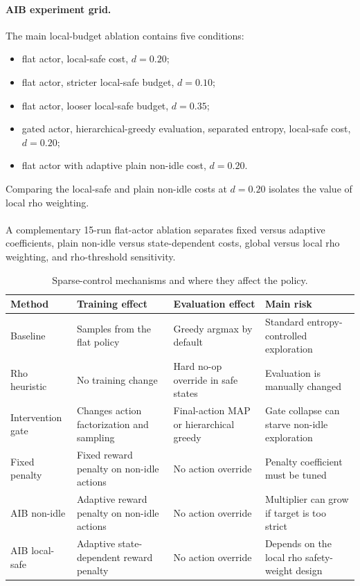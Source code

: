\paragraph{AIB experiment grid.}
The main local-budget ablation contains five conditions:
\begin{itemize}
  \item flat actor, local-safe cost, $d=0.20$;
  \item flat actor, stricter local-safe budget, $d=0.10$;
  \item flat actor, looser local-safe budget, $d=0.35$;
  \item gated actor,
  hierarchical-greedy evaluation, separated entropy, local-safe cost,
  $d=0.20$;
  \item flat actor with adaptive plain non-idle cost, $d=0.20$.
\end{itemize}
Comparing the local-safe and plain non-idle costs at $d=0.20$ isolates the
value of local rho weighting.
\\
\\
A complementary 15-run flat-actor ablation separates fixed versus adaptive coefficients,
plain non-idle versus state-dependent costs, global versus local rho weighting,
and rho-threshold sensitivity.

\begin{table}[htbp]
  \centering
  \small
  \caption{Sparse-control mechanisms and where they affect the policy.}
  \label{tab:sparse-control-mechanisms}
  \setlength{\tabcolsep}{3pt}
  \begin{tabular}{L{0.18\textwidth}L{0.30\textwidth}L{0.24\textwidth}L{0.18\textwidth}}
    \toprule
    Method & Training effect & Evaluation effect & Main risk \\
    \midrule
    Baseline & Samples from the flat policy & Greedy argmax by default &
    Standard entropy-controlled exploration \\
    Rho heuristic & No training change & Hard no-op override in safe states &
    Evaluation is manually changed \\
    Intervention gate & Changes action factorization and sampling &
    Final-action MAP or hierarchical greedy & Gate collapse can starve non-idle exploration \\
    Fixed penalty & Fixed reward penalty on non-idle actions & No action override &
    Penalty coefficient must be tuned \\
    AIB non-idle & Adaptive reward penalty on non-idle actions & No action override &
    Multiplier can grow if target is too strict \\
    AIB local-safe & Adaptive state-dependent reward penalty & No action override &
    Depends on the local rho safety-weight design \\
    \bottomrule
  \end{tabular}
\end{table}

